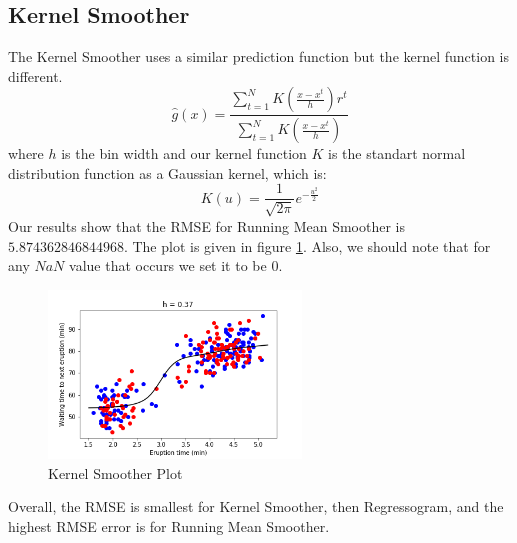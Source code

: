 \documentclass[11pt,reqno]{amsart}
\begin{document}
\subsection{Kernel Smoother}
The Kernel Smoother uses a similar prediction function but the kernel function is different. 
\begin{equation}
\hat{g}(x) = \frac{\sum_{t=1}^N K(\frac{x-x^t}{h})r^t}{\sum_{t=1}^N K(\frac{x-x^t}{h})}
\end{equation}
where $h$ is the bin width and our kernel function $K$ is the standart normal distribution function as a Gaussian kernel, which is:
\begin{equation}
K(u) = \frac{1}{\sqrt{2\pi}}e^{-\frac{u^2}{2}}
\end{equation}
Our results show that the RMSE for Running Mean Smoother is $5.874362846844968$. The plot is given in figure \ref{kernelfig}. Also, we should note that for any $NaN$ value that occurs we set it to be $0$.
\begin{figure}[ht]
	\centering
	\caption{Kernel Smoother Plot}
	\label{kernelfig}
	\begin{centering}
		\includegraphics[width=0.6\textwidth]{kernel.png}
	\end{centering}
\end{figure}
Overall, the RMSE is smallest for Kernel Smoother, then Regressogram, and the highest RMSE error is for Running Mean Smoother.
\end{document}
